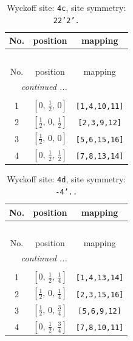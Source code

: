 \documentclass[fleqn,8pt]{jsarticle}
\begin{document}
\renewcommand{\arraystretch}{1.2}
\begin{longtable}{ccc}
\caption{Wyckoff site: {\tt 4c}, site symmetry: {\tt 22'2'.}}
 \\
 \hline \hline
No. & position & mapping \\ \hline \endfirsthead

\multicolumn{2}{l}{\tablename\ \thetable{}} \\
 \hline \hline
No. & position & mapping \\ \hline \endhead

 \hline \hline
\multicolumn{2}{r}{\footnotesize\it continued ...} \\ \endfoot

 \hline \hline
\multicolumn{2}{r}{} \\ \endlastfoot

1 & $\left[ 0,\, \frac{1}{2},\, 0 \right]$ & {\tt [1,4,10,11]} \\ \hline
2 & $\left[ \frac{1}{2},\, 0,\, \frac{1}{2} \right]$ & {\tt [2,3,9,12]} \\ \hline
3 & $\left[ \frac{1}{2},\, 0,\, 0 \right]$ & {\tt [5,6,15,16]} \\ \hline
4 & $\left[ 0,\, \frac{1}{2},\, \frac{1}{2} \right]$ & {\tt [7,8,13,14]} \\
\end{longtable}
\renewcommand{\arraystretch}{1.2}
\begin{longtable}{ccc}
\caption{Wyckoff site: {\tt 4d}, site symmetry: {\tt -4'..}}
 \\
 \hline \hline
No. & position & mapping \\ \hline \endfirsthead

\multicolumn{2}{l}{\tablename\ \thetable{}} \\
 \hline \hline
No. & position & mapping \\ \hline \endhead

 \hline \hline
\multicolumn{2}{r}{\footnotesize\it continued ...} \\ \endfoot

 \hline \hline
\multicolumn{2}{r}{} \\ \endlastfoot

1 & $\left[ 0,\, \frac{1}{2},\, \frac{1}{4} \right]$ & {\tt [1,4,13,14]} \\ \hline
2 & $\left[ \frac{1}{2},\, 0,\, \frac{1}{4} \right]$ & {\tt [2,3,15,16]} \\ \hline
3 & $\left[ \frac{1}{2},\, 0,\, \frac{3}{4} \right]$ & {\tt [5,6,9,12]} \\ \hline
4 & $\left[ 0,\, \frac{1}{2},\, \frac{3}{4} \right]$ & {\tt [7,8,10,11]} \\
\end{longtable}
\end{document}
